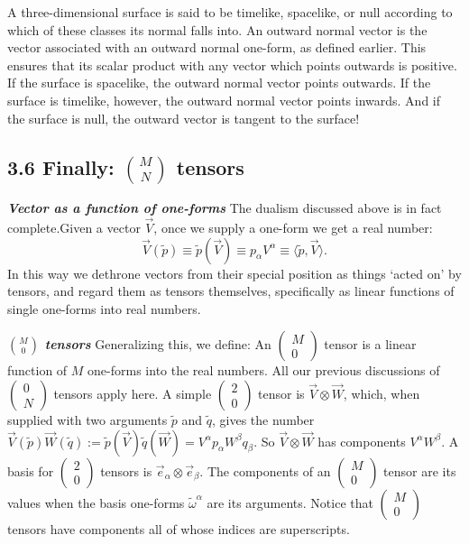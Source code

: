 \documentclass[12pt]{book}
\begin{document}
    A three-dimensional surface is said to be timelike, spacelike, or null according to which of these classes its normal falls into. An outward normal vector is the vector associated with an outward normal one-form, as defined earlier. This ensures that its scalar product with any vector which points outwards is positive. If the surface is spacelike, the outward normal vector points outwards. If the surface is timelike, however, the outward normal vector points inwards. And if the surface is null, the outward vector is tangent to the surface!

    \subsection{3.6 Finally: \(\binom{M}{N}\) tensors}

    \textit{\textbf{Vector as a function of one-forms}}
    The dualism discussed above is in fact complete.Given a vector \(\vec{V}\), once we supply a one-form we get a real number:
    \[
    \vec{V}(\tilde{p}) \equiv \tilde{p}(\vec{V}) \equiv p_\alpha V^\alpha \equiv \langle \tilde{p}, \vec{V} \rangle. \tag{3.54}
    \]
    In this way we dethrone vectors from their special position as things ‘acted on’ by tensors, and regard them as tensors themselves, specifically as linear functions of single one-forms into real numbers.
    
    \textit{\textbf{\(\binom{M}{0}\) tensors}}
    Generalizing this, we define:
    An \(\left(\begin{array}{c} M \\ 0 \end{array}\right)\) tensor is a linear function of \(M\) one-forms into the real numbers. All our previous discussions of \(\left(\begin{array}{c} 0 \\ N \end{array}\right)\) tensors apply here. A simple \(\left(\begin{array}{c} 2 \\ 0 \end{array}\right)\) tensor is \(\vec{V} \otimes \vec{W}\), which, when supplied with two arguments \(\tilde{p}\) and \(\tilde{q}\), gives the number \(\vec{V}(\tilde{p})\vec{W}(\tilde{q}) := \tilde{p}(\vec{V})\tilde{q}(\vec{W}) = V^\alpha p_\alpha W^\beta q_\beta\). So \(\vec{V} \otimes \vec{W}\) has components \(V^\alpha W^\beta\). A basis for \(\left(\begin{array}{c} 2 \\ 0 \end{array}\right)\) tensors is \(\vec{e}_\alpha \otimes \vec{e}_\beta\). The components of an \(\left(\begin{array}{c} M \\ 0 \end{array}\right)\) tensor are its values when the basis one-forms \(\tilde{\omega}^\alpha\) are its arguments. Notice that \(\left(\begin{array}{c} M \\ 0 \end{array}\right)\) tensors have components all of whose indices are superscripts.
\end{document}
